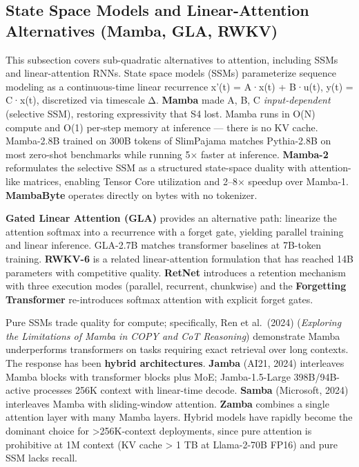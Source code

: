 \documentclass{article}
\begin{document}
\subsection{State Space Models and Linear-Attention Alternatives (Mamba, GLA, RWKV)}\label{state-space-models-and-linear-attention-alternatives-mamba-gla-rwkv}

This subsection covers sub-quadratic alternatives to attention, including SSMs and linear-attention RNNs. State space models (SSMs) parameterize sequence modeling as a continuous-time linear recurrence x'(t) = A·x(t) + B·u(t), y(t) = C·x(t), discretized via timescale Δ. \textbf{Mamba} \citep{gu2024mambalineartimeseq} made A, B, C \emph{input-dependent} (selective SSM), restoring expressivity that S4 lost. Mamba runs in O(N) compute and O(1) per-step memory at inference --- there is no KV cache. Mamba-2.8B trained on 300B tokens of SlimPajama matches Pythia-2.8B on most zero-shot benchmarks while running 5× faster at inference. \textbf{Mamba-2} \citep{dao2024flashattention2fas} reformulates the selective SSM as a structured state-space duality with attention-like matrices, enabling Tensor Core utilization and 2--8× speedup over Mamba-1. \textbf{MambaByte} \citep{wang20242024} operates directly on bytes with no tokenizer.

\textbf{Gated Linear Attention (GLA)} \citep{yang20242024} provides an alternative path: linearize the attention softmax into a recurrence with a forget gate, yielding parallel training and linear inference. GLA-2.7B matches transformer baselines at 7B-token training. \textbf{RWKV-6} is a related linear-attention formulation that has reached 14B parameters with competitive quality. \textbf{RetNet} introduces a retention mechanism with three execution modes (parallel, recurrent, chunkwise) and the \textbf{Forgetting Transformer} \citep{lin20242023} re-introduces softmax attention with explicit forget gates.

Pure SSMs trade quality for compute; specifically, Ren et al.~(2024) (\emph{Exploring the Limitations of Mamba in COPY and CoT Reasoning}) demonstrate Mamba underperforms transformers on tasks requiring exact retrieval over long contexts. The response has been \textbf{hybrid architectures}. \textbf{Jamba} (AI21, 2024) interleaves Mamba blocks with transformer blocks plus MoE; Jamba-1.5-Large 398B/94B-active processes 256K context with linear-time decode. \textbf{Samba} (Microsoft, 2024) interleaves Mamba with sliding-window attention. \textbf{Zamba} combines a single attention layer with many Mamba layers. Hybrid models have rapidly become the dominant choice for \textgreater256K-context deployments, since pure attention is prohibitive at 1M context (KV cache \textgreater{} 1 TB at Llama-2-70B FP16) and pure SSM lacks recall.
\end{document}
